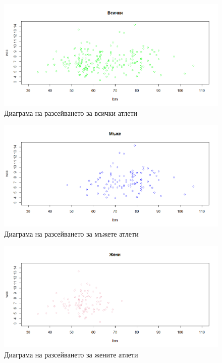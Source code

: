 \documentclass[12pt]{article} %
\begin{document}
\begin{large}
\begin{figure}[!h!]
\includegraphics[width=\textwidth,height=\textheight,keepaspectratio]{pics/scatterall}
\caption{Диаграма на разсейването за всички атлети}
\end{figure}

\begin{figure}[!h!]
\includegraphics[width=\textwidth,height=\textheight,keepaspectratio]{pics/scattermen}
\caption{Диаграма на разсейването за мъжете атлети}
\end{figure}

\clearpage
\begin{figure}[!h!]
\includegraphics[width=\textwidth,height=\textheight,keepaspectratio]{pics/scatterwomen2}
\caption{Диаграма на разсейването за жените атлети}
\end{figure}


\end{large}
\end{document}

